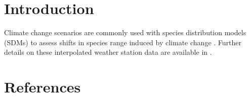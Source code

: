 \documentclass[10pt,letterpaper]{article}
\begin{document}
\section*{Introduction}

Climate change scenarios are commonly used with species distribution
models (SDMs) to assess shifts in species range induced by climate change
\citep{Thuiller2010, Thuiller2011, Lawler2013}. Further details on these interpolated weather
station data are available in \cite{Thuiller2004a}.

\section*{References}



\end{document}
